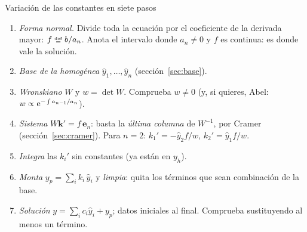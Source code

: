 \documentclass[11pt,twoside]{article}
\newcommand\yh{\hat y}
\newcommand\vk{\bm k}
\newcommand\ve{\bm e}
\begin{document}
\begin{metodo}{Variación de las constantes en siete pasos}
\begin{enumerate}
\item \emph{Forma normal.} Divide toda la ecuación por el coeficiente de la derivada mayor: $f\defeq b/a_n$. Anota el
intervalo donde $a_n\neq0$ y $f$ es continua: es donde vale la solución.
\item \emph{Base de la homogénea} $\yh_1,\dots,\yh_n$ (sección~\ref{sec:base}).
\item \emph{Wronskiano} $W$ y $w=\det W$. Comprueba $w\neq0$ (y, si quieres, Abel: $w\propto\mathrm{e}^{-\int a_{n-1}/a_n}$).
\item \emph{Sistema} $W\vk'=f\,\ve_n$: basta la \emph{última columna} de $W^{-1}$, por Cramer (sección~\ref{sec:cramer}).
Para $n=2$: $k_1'=-\yh_2f/w$, $k_2'=\yh_1f/w$.
\item \emph{Integra} las $k_i'$ sin constantes (ya están en $y_h$).
\item \emph{Monta} $y_p=\sum_ik_i\,\yh_i$ y \emph{limpia}: quita los términos que sean combinación de la base.
\item \emph{Solución} $y=\sum_ic_i\yh_i+y_p$; datos iniciales al final. Comprueba sustituyendo al menos un término.
\end{enumerate}
\end{metodo}
\end{document}
